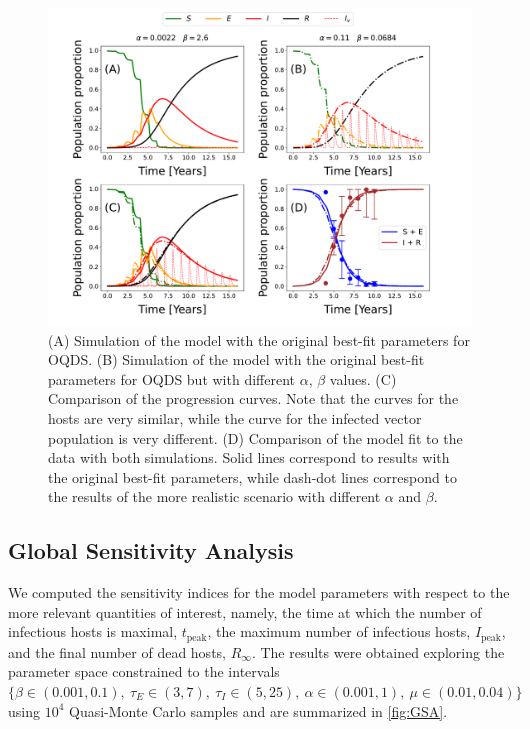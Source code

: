 \begin{figure}[H]
    \centering

    \includegraphics[width=\textwidth]{Figures/OQDS_different_vector_curves_same_host_curve.pdf}
    \caption[Comparison of the model fit to the data for OQDS with different
        transmission rates]{(A) Simulation of the model with the original
        best-fit parameters for OQDS. (B) Simulation of the model with the
        original best-fit parameters for OQDS but with different $\alpha$,
        $\beta$ values. (C) Comparison of the progression curves. Note that the
        curves for the hosts are very similar, while the curve for the infected
        vector population is very different. (D) Comparison of the model fit to
        the data with both simulations. Solid lines correspond to results with
        the original best-fit parameters, while dash-dot lines correspond to
        the	results of the more realistic scenario with different $\alpha$
        and $\beta$.}
    \label{fig:best_fit_model_OQDS}
\end{figure}

\subsection{Global Sensitivity Analysis}

We computed the sensitivity indices for the model parameters with respect
to the more relevant quantities of interest, namely, the time at which the
number of infectious hosts is maximal, $t_{\textrm{peak}}$, the maximum number
of infectious hosts, $I_{\textrm{peak}}$, and the final number of dead hosts,
$R_\infty$. The results were obtained exploring the parameter space constrained
to the intervals $\{\beta\in(0.001, 0.1), \ \tau_E\in(3,7), \ \tau_I\in(5,25),
    \ \alpha\in(0.001, 1), \ \mu\in(0.01, 0.04)\}$ using $10^4$ Quasi-Monte
Carlo
samples and are summarized in \cref{fig:GSA}.

